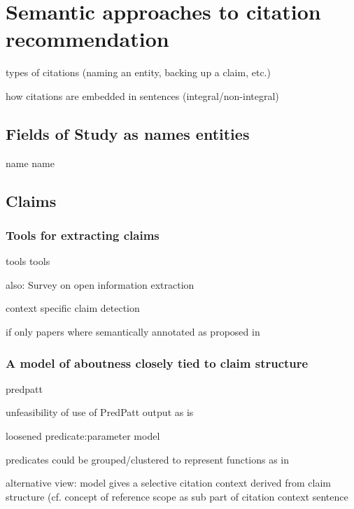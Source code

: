 \chapter{Semantic approaches to citation recommendation}\label{chap:approach}
types of citations (naming an entity, backing up a claim, etc.)

how citations are embedded in sentences (integral/non-integral\cite{Swales1990,Hyland1999,Thompson2001,Okamura2008,Lamers2018})

\section{Fields of Study as names entities}
name name

\section{Claims}
\subsection{Tools for extracting claims}
tools tools

also: Survey on open information extraction\cite{Niklaus2018}

context specific claim detection\cite{Levy2014}

if only papers where semantically annotated as proposed in \cite{BuckinghamShum2000}
\subsection{A model of aboutness closely tied to claim structure}
predpatt\cite{White2016,Zhang2017}

unfeasibility of use of PredPatt output as is

loosened predicate:parameter model

predicates could be grouped/clustered to represent functions as in \cite{Gabor2018}

alternative view: model gives a selective citation context derived from claim structure (cf. concept of reference scope as sub part of citation context sentence\cite{Abujbara2012,RAHUL2017}
